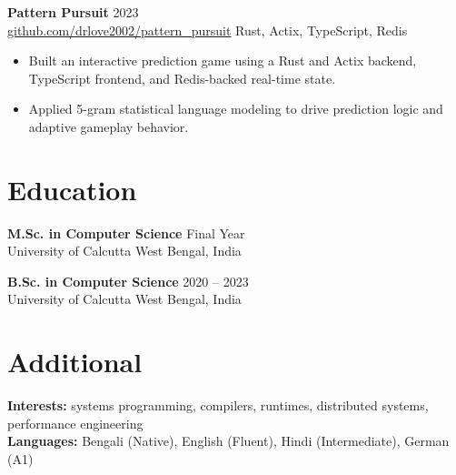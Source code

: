 \documentclass[10pt,a4paper]{article}
\newcommand{\resumesubheading}[4]{
  \textbf{#1} \hfill #2 \\
  #3 \hfill #4
}
\begin{document}
\resumesubheading{Pattern Pursuit}{2023}{\href{https://github.com/drlove2002/pattern_pursuit}{github.com/drlove2002/pattern\_pursuit}}{Rust, Actix, TypeScript, Redis}
\begin{itemize}
  \item Built an interactive prediction game using a Rust and Actix backend, TypeScript frontend, and Redis-backed real-time state.
  \item Applied 5-gram statistical language modeling to drive prediction logic and adaptive gameplay behavior.
\end{itemize}

\section*{Education}
\resumesubheading{M.Sc. in Computer Science}{Final Year}{University of Calcutta}{West Bengal, India}
\vspace{0.15em}

\resumesubheading{B.Sc. in Computer Science}{2020 -- 2023}{University of Calcutta}{West Bengal, India}

\section*{Additional}
\textbf{Interests:} systems programming, compilers, runtimes, distributed systems, performance engineering\\
\textbf{Languages:} Bengali (Native), English (Fluent), Hindi (Intermediate), German (A1)
\end{document}
